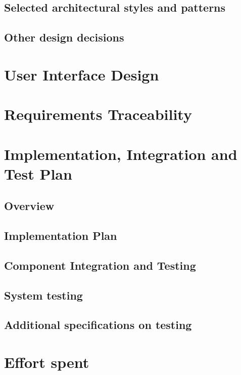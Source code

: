 \documentclass[a4paper,oneside,11pt]{article}
\begin{document}
        \subsection{Selected architectural styles and patterns}
            
        \subsection{Other design decisions}
            

    \newpage
    \section{User Interface Design}
        

    \newpage
    \section{Requirements Traceability}
        

    \newpage
    \section{Implementation, Integration and Test Plan}
        \subsection{Overview}
            
        \subsection{Implementation Plan}
            
        \subsection{Component Integration and Testing}
            
        \subsection{System testing}
            
        \subsection{Additional specifications on testing}
            

    \newpage
    \section{Effort spent}
        
            
\end{document}
